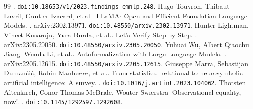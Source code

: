 \begin{thebibliography}{99}
. \texttt{doi:10.18653/v1/2023.findings-emnlp.248}.
Hugo Touvron, Thibaut Lavril, Gautier Izacard, et al..
\newblock LLaMA: Open and Efficient Foundation Language Models.
. arXiv:2302.13971. \texttt{doi:10.48550/arxiv.2302.13971}.
Hunter Lightman, Vineet Kosaraju, Yura Burda, et al..
\newblock Let's Verify Step by Step.
. arXiv:2305.20050. \texttt{doi:10.48550/arxiv.2305.20050}.
Yuhuai Wu, Albert Qiaochu Jiang, Wenda Li, et al..
\newblock Autoformalization with Large Language Models.
. arXiv:2205.12615. \texttt{doi:10.48550/arxiv.2205.12615}.
Giuseppe Marra, Sebastijan Dumančić, Robin Manhaeve, et al..
\newblock From statistical relational to neurosymbolic artificial intelligence: A survey.
. \texttt{doi:10.1016/j.artint.2023.104062}.
Thorsten Altenkirch, Conor Thomas McBride, Wouter Swierstra.
\newblock Observational equality, now!.
. \texttt{doi:10.1145/1292597.1292608}.
\end{thebibliography}
